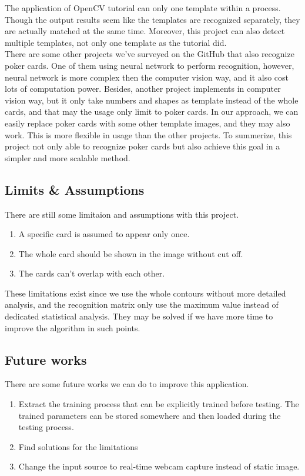 \documentclass{article}
\begin{document}
The application of OpenCV tutorial can only one template within a process. Though the output results seem like the templates are recognized separately, they are actually matched at the same time. Moreover, this project can also detect multiple templates, not only one template as the tutorial did.\\
There are some other projects we've surveyed on the GitHub that also recognize poker cards. One of them using neural network to perform recognition, however, neural network is more complex then the computer vision way, and it also cost lots of computation power. Besides, another project implements in computer vision way, but it only take numbers and shapes as template instead of the whole cards, and that may the usage only limit to poker cards. In our approach, we can easily replace poker cards with some other template images, and they may also work. This is more flexible in usage than the other projects. To summerize, this project not only able to recognize poker cards but also achieve this goal in a simpler and more scalable method.

\subsection*{Limits \& Assumptions}

There are still some limitaion and assumptions with this project.\\
\begin{enumerate}
    \item A specific card is assumed to appear only once.
    \item The whole card should be shown in the image without cut off.
    \item The cards can't overlap with each other.
\end{enumerate}
These limitations exist since we use the whole contours without more detailed analysis, and the recognition matrix only use the maximum value instead of dedicated statistical analysis. They may be solved if we have more time to improve the algorithm in such points.

\subsection*{Future works}

There are some future works we can do to improve this application.
\begin{enumerate}
    \item Extract the training process that can be explicitly trained before testing. The trained parameters can be stored somewhere and then loaded during the testing process.
    \item Find solutions for the limitations
    \item Change the input source to real-time webcam capture instead of static image.
\end{enumerate}
\end{document}
